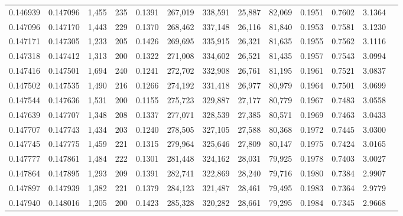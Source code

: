 \begin{tabular}{rrrrrrrrrrrrr}
0.146939 & 0.147096 & 1,455 & 235 &                                     0.1391 & 267,019 & 338,591 &  25,887 &  82,069 & 0.1951 & 0.7602 & 3.1364 \\
0.147096 & 0.147170 & 1,443 & 229 &                                     0.1370 & 268,462 & 337,148 &  26,116 &  81,840 & 0.1953 & 0.7581 & 3.1230 \\
0.147171 & 0.147305 & 1,233 & 205 &                                     0.1426 & 269,695 & 335,915 &  26,321 &  81,635 & 0.1955 & 0.7562 & 3.1116 \\
0.147318 & 0.147412 & 1,313 & 200 &                                     0.1322 & 271,008 & 334,602 &  26,521 &  81,435 & 0.1957 & 0.7543 & 3.0994 \\
0.147416 & 0.147501 & 1,694 & 240 &                                     0.1241 & 272,702 & 332,908 &  26,761 &  81,195 & 0.1961 & 0.7521 & 3.0837 \\
0.147502 & 0.147535 & 1,490 & 216 &                                     0.1266 & 274,192 & 331,418 &  26,977 &  80,979 & 0.1964 & 0.7501 & 3.0699 \\
0.147544 & 0.147636 & 1,531 & 200 &                                     0.1155 & 275,723 & 329,887 &  27,177 &  80,779 & 0.1967 & 0.7483 & 3.0558 \\
0.147639 & 0.147707 & 1,348 & 208 &                                     0.1337 & 277,071 & 328,539 &  27,385 &  80,571 & 0.1969 & 0.7463 & 3.0433 \\
0.147707 & 0.147743 & 1,434 & 203 &                                     0.1240 & 278,505 & 327,105 &  27,588 &  80,368 & 0.1972 & 0.7445 & 3.0300 \\
0.147745 & 0.147775 & 1,459 & 221 &                                     0.1315 & 279,964 & 325,646 &  27,809 &  80,147 & 0.1975 & 0.7424 & 3.0165 \\
0.147777 & 0.147861 & 1,484 & 222 &                                     0.1301 & 281,448 & 324,162 &  28,031 &  79,925 & 0.1978 & 0.7403 & 3.0027 \\
0.147864 & 0.147895 & 1,293 & 209 &                                     0.1391 & 282,741 & 322,869 &  28,240 &  79,716 & 0.1980 & 0.7384 & 2.9907 \\
0.147897 & 0.147939 & 1,382 & 221 &                                     0.1379 & 284,123 & 321,487 &  28,461 &  79,495 & 0.1983 & 0.7364 & 2.9779 \\
0.147940 & 0.148016 & 1,205 & 200 &                                     0.1423 & 285,328 & 320,282 &  28,661 &  79,295 & 0.1984 & 0.7345 & 2.9668 \\

\end{tabular}
